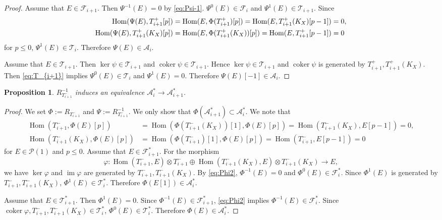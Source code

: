 \documentclass[leqno,11pt]{amsart}
\def\Hom{\mathop{\mathrm{Hom}}\nolimits}
\def\im{\mathop{\mathrm{im}}\nolimits}
\def\coker{\mathop{\mathrm{coker}}\nolimits}
\newtheorem{Prop}[Thm]{Proposition}
\theoremstyle{definition}
\def\AA{\ensuremath{\mathcal A}}
\def\FF{\ensuremath{\mathcal F}}
\def\PP{\ensuremath{\mathcal P}}
\def\TT{\ensuremath{\mathcal T}}
\begin{document}
\begin{proof}
Assume that 
$E \in \FF_{i+1}$.
Then $\Psi^{-1}(E)=0$ by \eqref{eq:Psi-1}.
$\Psi^0(E) \in \FF_i$ and $\Psi^1(E) \in \TT_{i+1}$.
Since
\begin{equation}\label{eq:T_{i+1}}
\begin{split}
\Hom(\Psi(E),T_{i+1}^+[p])& =\Hom(E,\Phi(T_{i+1}^+)[p])=
\Hom(E, T_{i+1}^+(K_X)[p-1])=0,\\
\Hom(\Psi(E),T_{i+1}^+(K_X)[p])& =\Hom(E,\Phi(T_{i+1}^+(K_X))[p])=
\Hom(E, T_{i+1}^+[p-1])=0
\end{split}
\end{equation}
for $p \leq 0$,
$\Psi^1(E) \in \TT_i$.
Therefore $\Psi(E) \in \AA_i$.



Assume that $E \in \TT_{i+1}$.
Then $\ker \psi \in \TT_{i+1}$ and
$\coker \psi \in \TT_{i+1}$.
Hence $\ker \psi \in \TT_{i+1}$ and
$\coker \psi$ is generated by $T_{i+1}^+,T_{i+1}^+(K_X)$. 
Then \eqref{eq:T_{i+1}} implies $\Psi^0(E) \in \TT_i$ and
$\Psi^1(E)=0$.
Therefore $\Psi(E)[-1] \in \AA_i$.
\end{proof}






\begin{Prop}\label{Prop:equiv2}
$R_{T_{i+1}^-}^{-1}$ induces an equivalence
$\AA_i^* \to \AA_{i+1}^*$.
\end{Prop}

\begin{proof}
We set $\Phi:=R_{T_{i+1}^-}$ and $\Psi:=R_{T_{i+1}^-}^{-1}$.
We only show that 
$\Phi(\AA_{i+1}^*) \subset \AA_i^*$.
We note that 
\begin{equation}\label{eq:Phi2}
\begin{split}
\Hom(T_{i+1}^-,\Phi(E)[p])& =\Hom(\Phi(T_{i+1}^-(K_X))[1],\Phi(E)[p])
=\Hom(T_{i+1}^-(K_X),E[p-1])=0,\\
\Hom(T_{i+1}^-(K_X),\Phi(E)[p])&=\Hom(\Phi(T_{i+1}^-)[1],\Phi(E)[p])
=\Hom(T_{i+1}^-,E[p-1])=0
\end{split}
\end{equation}
for $E \in \PP(1)$ and $p \leq 0$.
Assume that $E \in \FF_{i+1}^*$.
For the morphism
\begin{equation}
\varphi:\Hom(T_{i+1}^-,E) \otimes T_{i+1}^- \oplus  
\Hom(T_{i+1}^-(K_X),E) \otimes T_{i+1}^- (K_X)
\to E,
\end{equation}
we have $\ker\varphi$ and $\im \varphi$ are generated by
$T_{i+1}^-,T_{i+1}^- (K_X)$.
By \eqref{eq:Phi2}, $\Phi^{-1}(E)=0$ and $\Phi^0(E) \in \FF_i^*$.
Since $\Phi^1(E)$ is generated by
$T_{i+1}^-,T_{i+1}^- (K_X)$,
$\Phi^1(E) \in \TT_i^*$.
Therefore $\Phi(E[1]) \in \AA_i^*$.


Assume that $E \in \TT_{i+1}^*$.
Then $\Phi^1(E)=0$.
Since $\Phi^{-1}(E) \in \FF_{i+1}^*$, \eqref{eq:Phi2} implies
$\Phi^{-1}(E) \in \FF_i^*$.
Since $\coker \varphi, T_{i+1}^-, T_{i+1}^- (K_X) \in \TT_i^*$,
$\Phi^0(E) \in \TT_i^*$.
Therefore $\Phi(E) \in \AA_i^*$.
\end{proof}
\end{document}
